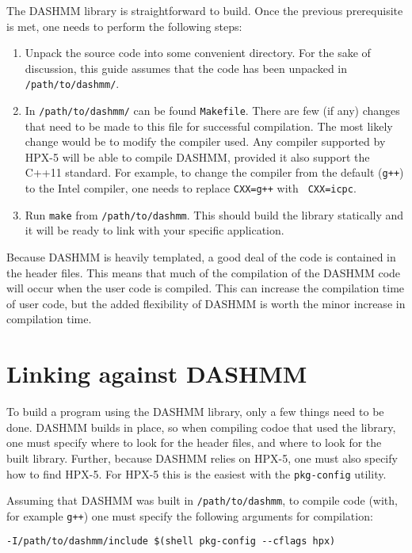 \documentclass[11pt]{book}
\begin{document}
The DASHMM library is straightforward to build. Once the previous
prerequisite is met, one needs to perform the following steps: 

\begin{enumerate} 
\item Unpack the source code into some convenient directory. For the
  sake of discussion, this guide assumes that the code has been
  unpacked in {\tt /path/to/dashmm/}. 
\item In {\tt /path/to/dashmm/} can be found {\tt Makefile}. There are
  few (if any) changes that need to be made to this file for
  successful compilation. The most likely change would be to modify
  the compiler used. Any compiler supported by HPX-5 will be able to
  compile DASHMM, provided it also support the C++11 standard. For
  example, to change the compiler from the default ({\tt g++}) to the
  Intel compiler, one needs to replace {\tt CXX=g++} with {\tt
    CXX=icpc}. 
\item Run {\tt make} from {\tt /path/to/dashmm}. This should build the
  library statically and it will be ready to link with your specific
  application. 
\end{enumerate} 

Because DASHMM is heavily templated, a good deal of the code is
contained in the header files. This means that much of the compilation
of the DASHMM code will occur when the user code is compiled. This can
increase the compilation time of user code, but the added flexibility
of DASHMM is worth the minor increase in compilation time. 

\section{Linking against DASHMM} 

To build a program using the DASHMM library, only a few things need to
be done. DASHMM builds in place, so when compiling codoe that used the
library, one must specify where to look for the header files, and
where to look for the built library. Further, because DASHMM relies on
HPX-5, one must also specify how to find HPX-5. For HPX-5 this is the
easiest with the {\tt pkg-config} utility. 

Assuming that DASHMM was built in {\tt /path/to/dashmm}, to compile
code (with, for example {\tt g++}) one must specify the following
arguments for compilation: 

\begin{verbatim} 
-I/path/to/dashmm/include $(shell pkg-config --cflags hpx)
\end{verbatim} 
\end{document}
